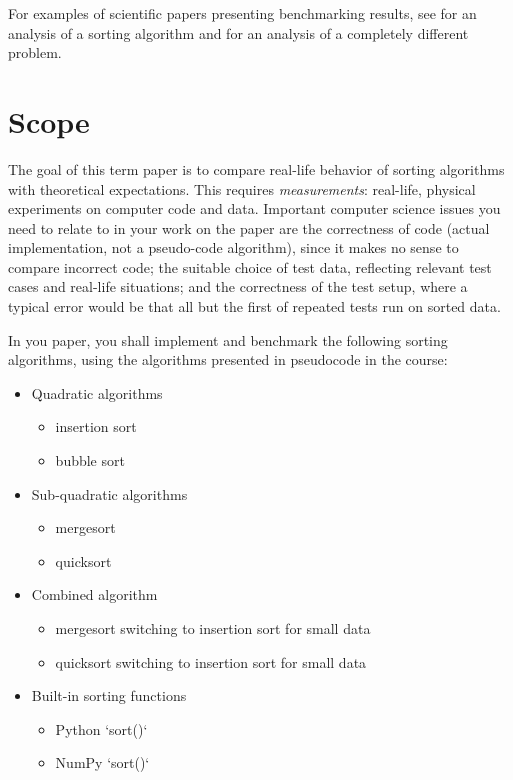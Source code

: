 \documentclass[sigconf, nonacm, natbib, screen, balance=False]{acmart}
\begin{document}
For examples of scientific papers presenting benchmarking
results, see \citet{Edel:2019(1.4)} for an analysis of a sorting
algorithm and \citet{Ippe:2017(30)} for an analysis of a
completely different problem.

\section{Scope}\label{sec:scope}

The goal of this term paper is to compare real-life behavior of
sorting algorithms with theoretical expectations.  This requires
\emph{measurements}: real-life, physical experiments on computer code
and data.  Important computer science issues you need to relate to in
your work on the paper are the correctness of code (actual
implementation, not a pseudo-code algorithm), since it makes no sense
to compare incorrect code; the suitable choice of test data, reflecting
relevant test cases and real-life situations; and the correctness of
the test setup, where a typical error would be that all but the first
of repeated tests run on sorted data.

In you paper, you shall implement and benchmark the following
sorting algorithms, using the algorithms presented in pseudocode in
the course:
\begin{itemize}
\item Quadratic algorithms
  \begin{itemize}
  \item insertion sort
  \item bubble sort
  \end{itemize}
\item Sub-quadratic algorithms
  \begin{itemize}
  \item mergesort
  \item quicksort
  \end{itemize}
\item Combined algorithm
  \begin{itemize}
  \item mergesort switching to insertion sort for small data
    \item quicksort switching to insertion sort for small data
  \end{itemize}
\item Built-in sorting functions
  \begin{itemize}
  \item Python `sort()`
  \item NumPy `sort()`
  \end{itemize}
\end{itemize}
\end{document}
